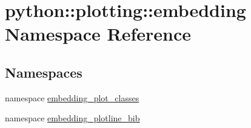 \hypertarget{namespacepython_1_1plotting_1_1embedding}{
\section{python::plotting::embedding Namespace Reference}
\label{namespacepython_1_1plotting_1_1embedding}
}
\subsection*{Namespaces}
\begin{DoxyCompactItemize}
\item 
namespace \hyperlink{namespacepython_1_1plotting_1_1embedding_1_1embedding__plot__classes}{embedding\_\-plot\_\-classes}
\item 
namespace \hyperlink{namespacepython_1_1plotting_1_1embedding_1_1embedding__plotline__bib}{embedding\_\-plotline\_\-bib}
\end{DoxyCompactItemize}
